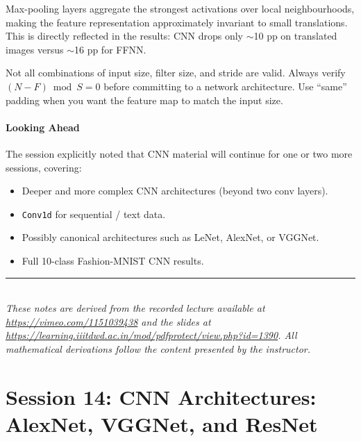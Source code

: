 \documentclass[12pt,a4paper]{article}
\begin{document}
\begin{keyinsight}[title=Key Takeaway 2 -- Translation Invariance]
Max-pooling layers aggregate the strongest activations over local
neighbourhoods, making the feature representation approximately invariant to
small translations.  This is directly reflected in the results: CNN drops only
$\sim$10 pp on translated images versus $\sim$16 pp for FFNN.
\end{keyinsight}

\begin{keyinsight}[title=Key Takeaway 3 -- Validity of Configurations]
Not all combinations of input size, filter size, and stride are valid.  Always
verify $(N-F)\bmod S = 0$ before committing to a network architecture.  Use
``same'' padding when you want the feature map to match the input size.
\end{keyinsight}

\subsection{Looking Ahead}
\label{subsec:ahead}

The session explicitly noted that CNN material will continue for one or two
more sessions, covering:

\begin{itemize}[leftmargin=2em]
  \item Deeper and more complex CNN architectures (beyond two conv layers).
  \item \texttt{Conv1d} for sequential / text data.
  \item Possibly canonical architectures such as LeNet, AlexNet, or VGGNet.
  \item Full 10-class Fashion-MNIST CNN results.
\end{itemize}

\vspace{1.5em}
\noindent\rule{\textwidth}{0.5pt}\\[0.3em]
{\small\itshape
These notes are derived from the recorded lecture available at
\url{https://vimeo.com/1151039438} and the slides at
\url{https://learning.iiitdwd.ac.in/mod/pdfprotect/view.php?id=1390}.
All mathematical derivations follow the content presented by the instructor.}

\clearpage

\part{Session 14: CNN Architectures: AlexNet, VGGNet, and ResNet}
\end{document}
